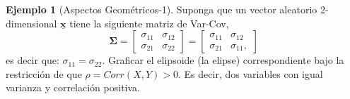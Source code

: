 \documentclass[
]{book}
\theoremstyle{definition}
\theoremstyle{definition}
\newtheorem{example}{Ejemplo}[chapter]
\theoremstyle{definition}
\theoremstyle{definition}
\theoremstyle{remark}
\begin{document}
\begin{example}[Aspectos Geométricos-1]
\protect\hypertarget{exm:ejemplo-aspectos-geom-1}{}\label{exm:ejemplo-aspectos-geom-1}Suponga que un vector aleatorio \(2\)-dimensional \(\underline{\mathbf{x}}\) tiene la siguiente matriz de Var-Cov,
\[
\mathbf{\Sigma}=\begin{bmatrix}
\sigma_{11} & \sigma_{12}\\
\sigma_{21} & \sigma_{22}
\end{bmatrix}=\begin{bmatrix}
\sigma_{11} & \sigma_{12}\\
\sigma_{21} & \sigma_{11},
\end{bmatrix}
\]
es decir que: \(\sigma_{11}=\sigma_{22}\). Graficar el elipsoide (la elipse) correspondiente bajo la restricción de que \(\rho=Corr(X,Y)>0\). Es decir, dos variables con igual varianza y correlación positiva.
\end{example}
\end{document}
